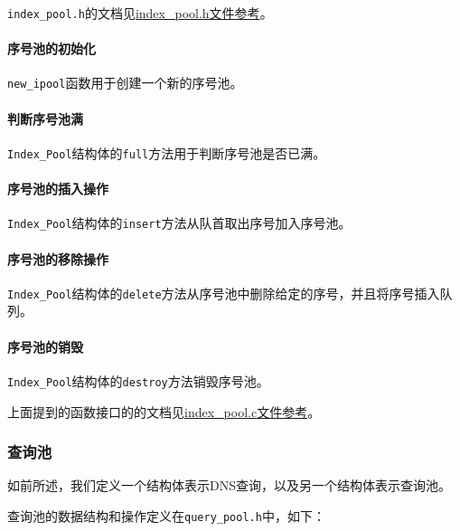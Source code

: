 \documentclass[lang=cn,11pt,a4paper,cite=authornum]{paper}
\begin{document}
\texttt{index_pool.h}的文档见\href{run:./APIdoc/index__pool_8h.html}{index\_pool.h文件参考}。

\paragraph{序号池的初始化}

\texttt{new_ipool}函数用于创建一个新的序号池。

\paragraph{判断序号池满}

\texttt{Index_Pool}结构体的\texttt{full}方法用于判断序号池是否已满。

\paragraph{序号池的插入操作}

\texttt{Index_Pool}结构体的\texttt{insert}方法从队首取出序号加入序号池。

\paragraph{序号池的移除操作}

\texttt{Index_Pool}结构体的\texttt{delete}方法从序号池中删除给定的序号，并且将序号插入队列。

\paragraph{序号池的销毁}

\texttt{Index_Pool}结构体的\texttt{destroy}方法销毁序号池。

上面提到的函数接口的的文档见\href{run:./APIdoc/index__pool_8c.html}{index\_pool.c文件参考}。

\subsubsection{查询池}

如前所述，我们定义一个结构体表示DNS查询，以及另一个结构体表示查询池。

查询池的数据结构和操作定义在\texttt{query_pool.h}中，如下：
\end{document}
